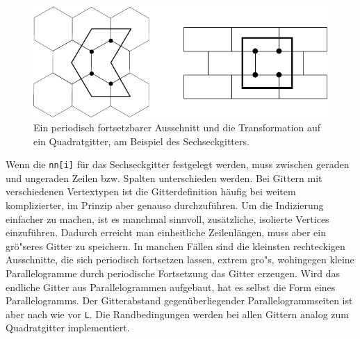   \begin{figure}[htbp]
  \centering
  \includegraphics{./Numerik-figs/sechseck}
  \caption{Ein periodisch fortsetzbarer Ausschnitt und die Transformation auf ein Quadratgitter, am Beispiel des Sechseckgitters.}
  \label{fig:sechseckapp}
\end{figure}
Wenn die \texttt{nn[i]} f\"ur das Sechseckgitter festgelegt werden, muss zwischen geraden und ungeraden Zeilen bzw. Spalten unterschieden werden. Bei Gittern mit verschiedenen Vertextypen ist die Gitterdefinition h\"aufig bei weitem komplizierter, im Prinzip aber genauso durchzuf\"uhren. Um die Indizierung einfacher zu machen, ist es manchmal sinnvoll, zus\"atzliche, isolierte Vertices einzuf\"uhren. Dadurch erreicht man einheitliche Zeilenl\"angen, muss aber ein gr\"o"seres Gitter zu speichern. In manchen F\"allen sind die kleinsten rechteckigen Ausschnitte, die sich periodisch fortsetzen lassen, extrem gro"s, wohingegen kleine Parallelogramme durch periodische Fortsetzung das Gitter erzeugen. Wird das endliche Gitter aus Parallelogrammen aufgebaut, hat es selbst die Form eines Parallelogramms. Der Gitterabstand gegen\"uberliegender Parallelogrammseiten ist aber nach wie vor \texttt{L}. Die Randbedingungen werden bei allen Gittern analog zum Quadratgitter implementiert.

